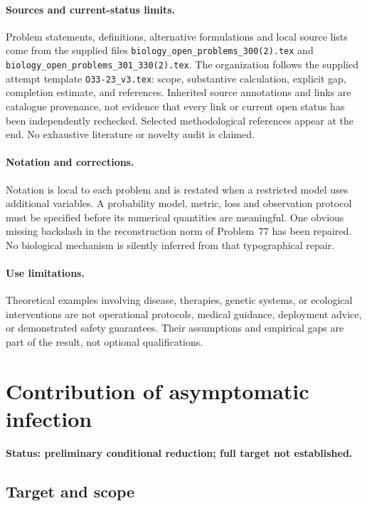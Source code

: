 \documentclass[11pt]{article}
\begin{document}
\paragraph{Sources and current-status limits.}
Problem statements, definitions, alternative formulations and local source lists
come from the supplied files
\texttt{biology\_open\_problems\_300(2).tex} and
\texttt{biology\_open\_problems\_301\_330(2).tex}.
The organization follows the supplied attempt template
\texttt{O33-23\_v3.tex}: scope, substantive calculation, explicit gap,
completion estimate, and references. Inherited source annotations and links are
catalogue provenance, not evidence that every link or current open status has
been independently rechecked. Selected methodological references appear at the
end. No exhaustive literature or novelty audit is claimed.

\paragraph{Notation and corrections.}
Notation is local to each problem and is restated when a restricted model uses
additional variables. A probability model, metric, loss and observation protocol
must be specified before its numerical quantities are meaningful. One obvious
missing backslash in the reconstruction norm of Problem~77 has been repaired.
No biological mechanism is silently inferred from that typographical repair.

\paragraph{Use limitations.}
Theoretical examples involving disease, therapies, genetic systems, or ecological
interventions are not operational protocols, medical guidance, deployment advice,
or demonstrated safety guarantees. Their assumptions and empirical gaps are part
of the result, not optional qualifications.


\section*{Contribution of asymptomatic infection}
\label{prob:204}
\noindent\textbf{Status: preliminary conditional reduction; full target not established.}
\subsection{Target and scope}
\end{document}
